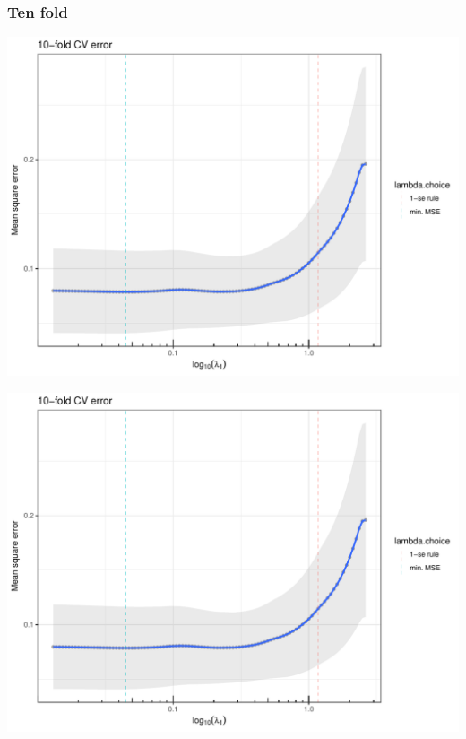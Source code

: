 \documentclass{beamer}\usepackage[]{graphicx}\usepackage[]{color}
\newenvironment{knitrout}{}{} %
\begin{document}
\begin{frame}[containsverbatim]
  \frametitle{Ten fold}
\begin{knitrout}\scriptsize
{}\color{fgcolor}
\includegraphics[width=.8\textwidth]{figures/crit_lassounnamed-chunk-37-1} 

\includegraphics[width=.8\textwidth]{figures/crit_lassounnamed-chunk-37-2} 

\end{knitrout}
\end{frame}
\end{document}
